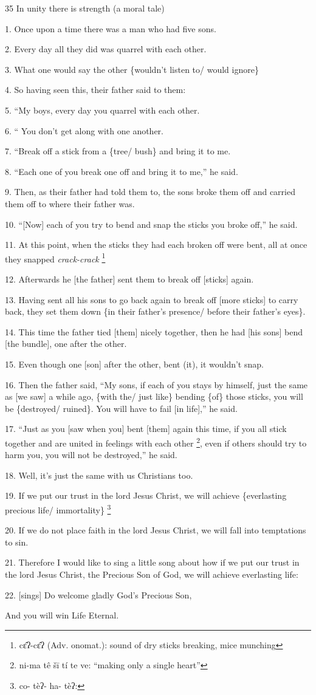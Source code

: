 
35 In unity there is strength (a moral tale)

1. Once upon a time there was a man who had five sons.

2. Every day all they did was quarrel with each other.

3. What one would say the other \{wouldn't listen to/ would ignore\}

4. So having seen this, their father said to them:

5. ``My boys, every day you quarrel with each other.

6. `` You don't get along with one another.

7. ``Break off a stick from a \{tree/ bush\} and bring it to me.

8. ``Each one of you break one off and bring it to me,'' he said.

9. Then, as their father had told them to, the sons broke them off and carried
them off to where their father was.

10. ``[Now] each of you try to bend and snap the sticks you broke off,'' he said.

11. At this point, when the sticks they had each broken off were bent, all at once
they snapped \textit{crack-crack} \.\footnote{cɛ̂ʔ-cɛ̂ʔ (Adv. onomat.): sound of dry sticks breaking, mice munching}

12. Afterwards he [the father] sent them to break off [sticks] again.

13. Having sent all his sons to go back again to break off [more sticks] to carry
back, they set them down \{in their father's presence/ before their father's eyes\}.

14. This time the father tied [them] nicely together, then he had [his sons] bend
[the bundle], one after the other.

15. Even though one [son] after the other, bent (it), it wouldn't snap.

16. Then the father said, ``My sons, if each of you stays by himself, just the
same as [we saw] a while ago, \{with the/ just like\} bending \{of\} those sticks,
you will be \{destroyed/ ruined\}.  You will have to fail [in life],'' he said.

17. ``Just as you [saw when you] bent [them] again this time, if you all stick
together and are united in feelings with each other \footnote{ni-ma  tê  šī   tí  te  ve: ``making only a single heart''}, even if others should
try to harm you, you will not be destroyed,'' he said.

18. Well, it's just the same with us Christians too.

19. If we put our trust in the lord Jesus Christ, we will achieve \{everlasting
precious life/ immortality\} \.\footnote{co-  tèʔ-  ha-  tèʔ:}

20. If we do not place faith in the lord Jesus Christ, we will fall into temptations
to sin.

21. Therefore I would like to sing a little song about how if we put our trust
in the lord Jesus Christ, the Precious Son of God, we will achieve everlasting
life:

22. [sings] Do welcome gladly God's Precious Son,

And you will win Life Eternal.

